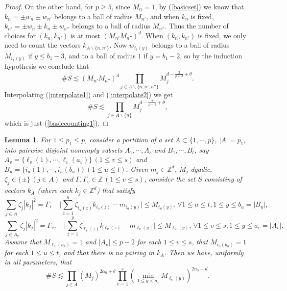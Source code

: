 \documentclass[11 pt,reqno]{amsart}
\newtheorem{lem}[thm]{Lemma}
\theoremstyle{definition}
\theoremstyle{remark}
\numberwithin{equation}{section}
\newcommand{\Zb}{\mathbb{Z}}
\begin{document}
{\begin{proof}
On the other hand, for $p\geq 5$, since $M_n=1$, by (\ref{basicset}) we know that $k_n=\pm w_{n}\pm w_{n'}$ belongs to a ball of radius $M_{n'}$, and when $k_n$ is fixed, $k_{n'}=\pm w_n\pm k_n\pm w_{n''}$ belongs to a ball of radius $M_{n''}$. Thus the number of choices for $(k_n,k_{n'})$ is at most $(M_{n'}M_{n''})^d$. When $(k_n,k_{n'})$ is fixed, we only need to count the vectors $k_{A\backslash\{n,n'\}}$. Now $w_{i_1(y)}$ belongs to a ball of radius $M_{i_1(y)}$ if $y\leq b_1-3$, and to a ball of radius $1$ if $y=b_1-2$, so by the induction hypothesis we conclude that
\begin{equation}\label{interpolate2}\#S\lesssim (M_{n'}M_{n''})^{d}\prod_{j\in A\backslash\{n,n',n''\}}M_j^{d-\frac{2}{p-3}+\theta}.\end{equation} Interpolating (\ref{interpolate1}) and (\ref{interpolate2}) we get
\[\#S\lesssim\prod_{j\in A\backslash\{n\}}M_j^{d-\frac{2}{p-1}+\theta},\] which is just (\ref{basiccounting1}).
 \end{proof}
 \begin{lem}\label{general1}For $1\leq p_1\leq p$, consider a partition of a set $A\subset\{1,\cdots,p\}$, $|A|=p_1$, into pairwise disjoint nonempty subsets $A_1,\cdots,A_s$ and $B_1,\cdots,B_t$, say $A_v=\{\ell_v(1),\cdots,\ell_v(a_v)\}\,(1\leq v\leq s)$ and $B_u=\{i_u(1),\cdots,i_u(b_u)\}\,(1\leq u\leq t)$. Given $m_j\in\Zb^d$, $M_j$ dyadic, $\zeta_j\in\{\pm\}\,(j\in A)$ and $\Gamma,\Gamma_v\in\Zb\,(1\leq v\leq s)$, consider the set $S$ consisting of vectors $k_A$ (where each $k_j\in\Zb^d$) that satisfy
 \begin{equation}\label{generalset1}\sum_{j\in A}\zeta_j|k_j|^2=\Gamma,\quad \bigg|\sum_{z=1}^y\zeta_{i_u(z)}k_{i_u(z)}-m_{i_u(y)}\bigg|\leq M_{i_u(y)},\,\forall 1\leq u\leq t,1\leq y\leq b_u=|B_u|,
 \end{equation}
  \begin{equation}\label{generalset2}\sum_{j\in A_v}\zeta_j|k_j|^2=\Gamma_v,\quad\bigg|\sum_{z=1}^y\zeta_{\ell_v(z)}k_{\ell_v(z)}-m_{\ell_v(y)}\bigg|\leq M_{\ell_u(y)},\,\forall 1\leq v\leq s,1\leq y\leq a_v=|A_v|.
 \end{equation}
Assume that $M_{\ell_v(a_v)}=1$ and $|A_v|\leq p-2$ for each $1\leq v\leq s$, that $M_{i_u(b_u)}=1$ for each $1\leq u\leq t$, and that there is no pairing in $k_A$. Then we have, uniformly in all parameters, that
 \begin{equation}\label{generalcounting1}\#S\lesssim\prod_{j\in A}(M_j)^{2\alpha_0+\theta}\prod_{v=1}^s(\min_{1\leq y<a_v}M_{\ell_v(y)})^{2\alpha_0-d}.

\end{equation}
\end{lem}}
\end{document}
